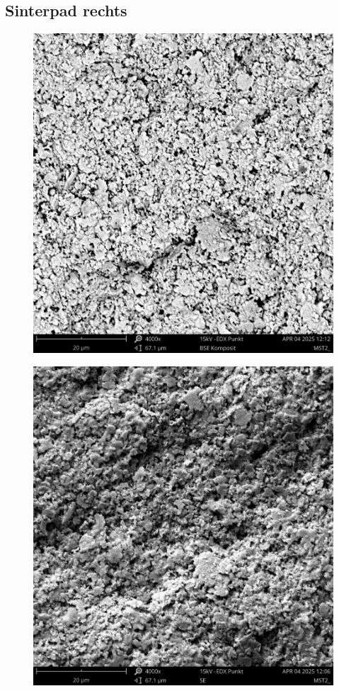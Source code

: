 \subsection{Sinterpad rechts}
    \begin{figure}[H]
        \centering
        \begin{minipage}{.5\textwidth}
          \centering
          \includegraphics[width=.9\linewidth]{Bilder/MST2_0013}
          \label{Abb.2: REM-Aufnahme(BSE Komposit, 4000x) des SinterPads rechts mit Punktanalyse}
        \end{minipage}%
        \begin{minipage}{.5\textwidth}
          \centering
          \includegraphics[width=.9\linewidth]{Bilder/MST2_0010}

\end{minipage}
\end{figure}
